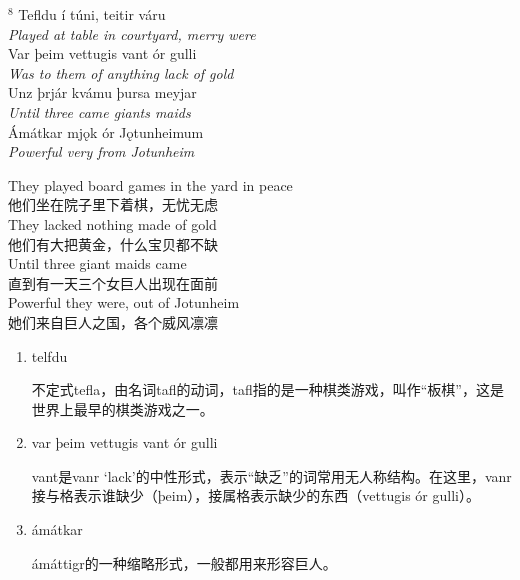 \begin{paracol}{2}
    \noindent
    $^8 $ Tefldu í túni, teitir váru\\
    \textit{Played at table in courtyard, merry were}\\
    Var þeim vettugis vant ór gulli\\
    \textit{Was to them of anything lack of gold}\\
    Unz þrjár kvámu þursa meyjar\\
    \textit{Until three came giants maids}\\
    Ámátkar mjǫk ór Jǫtunheimum\\
    \textit{Powerful very from Jotunheim}\\

    \switchcolumn

    \noindent
    They played board games in the yard in peace\\
    他们坐在院子里下着棋，无忧无虑\\
    They lacked nothing made of gold\\
    他们有大把黄金，什么宝贝都不缺\\
    Until three giant maids came\\
    直到有一天三个女巨人出现在面前\\
    Powerful they were, out of Jotunheim\\
    她们来自巨人之国，各个威风凛凛\\

\end{paracol}

\begin{grammar*}{}
    \begin{enumerate}[leftmargin=*]
        \item telfdu

              不定式tefla，由名词tafl的动词，tafl指的是一种棋类游戏，叫作“板棋”，这是世界上最早的棋类游戏之一。

        \item var þeim vettugis vant ór gulli

              vant是vanr `lack'的中性形式，表示“缺乏”的词常用无人称结构。在这里，vanr接与格表示谁缺少（þeim），接属格表示缺少的东西（vettugis ór gulli）。
        \item ámátkar

              ámáttigr的一种缩略形式，一般都用来形容巨人。
    \end{enumerate}
\end{grammar*}